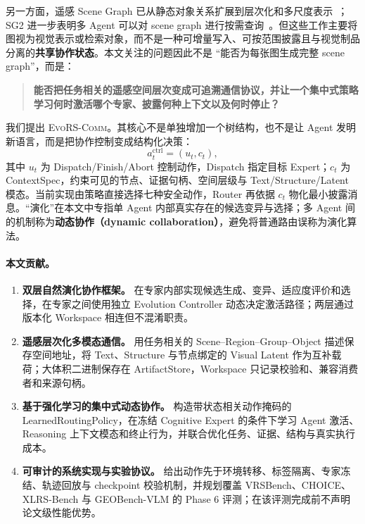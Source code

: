\documentclass[10pt,a4paper,twocolumn]{ctexart}
\newcommand{\ours}{\textsc{EvoRS-Comm}}
\begin{document}
另一方面，遥感 Scene Graph 已从静态对象关系扩展到层次化和多尺度表示~\cite{knyaz2025,knyaz2026}；SG2 进一步表明多 Agent 可以对 scene graph 进行按需查询~\cite{sg2}。但这些工作主要将图视为视觉表示或检索对象，而不是一种可增量写入、可按范围披露且与视觉制品分离的\textbf{共享协作状态}。本文关注的问题因此不是 ``能否为每张图生成完整 scene graph''，而是：

\begin{quote}\small
\textbf{能否把任务相关的遥感空间层次变成可追溯通信协议，并让一个集中式策略学习何时激活哪个专家、披露何种上下文以及何时停止？}
\end{quote}

我们提出 \ours。其核心不是单独增加一个树结构，也不是让 Agent 发明新语言，而是把协作控制变成结构化决策：
\begin{equation}
 a_t^{\mathrm{ctrl}}=(u_t,c_t),
 \label{eq:commaction}
\end{equation}
其中 $u_t$ 为 Dispatch/Finish/Abort 控制动作，Dispatch 指定目标 Expert；$c_t$ 为 ContextSpec，约束可见的节点、证据句柄、空间层级与 Text/Structure/Latent 模态。当前实现由策略直接选择七种安全动作，Router 再依据 $c_t$ 物化最小披露消息。``演化''在本文中专指单 Agent 内部真实存在的候选变异与选择；多 Agent 间的机制称为\textbf{动态协作（dynamic collaboration）}，避免将普通路由误称为演化算法。

\paragraph{本文贡献。}
\begin{enumerate}
    \item \textbf{双层自然演化协作框架。} 在专家内部实现候选生成、变异、适应度评价和选择，在专家之间使用独立 Evolution Controller 动态决定激活路径；两层通过版本化 Workspace 相连但不混淆职责。
    \item \textbf{遥感层次化多模态通信。} 用任务相关的 Scene--Region--Group--Object 描述保存空间地址，将 Text、Structure 与节点绑定的 Visual Latent 作为互补载荷；大体积二进制保存在 ArtifactStore，Workspace 只记录校验和、兼容消费者和来源句柄。
    \item \textbf{基于强化学习的集中式动态协作。} 构造带状态相关动作掩码的 LearnedRoutingPolicy，在冻结 Cognitive Expert 的条件下学习 Agent 激活、Reasoning 上下文模态和终止行为，并联合优化任务、证据、结构与真实执行成本。
    \item \textbf{可审计的系统实现与实验协议。} 给出动作先于环境转移、标签隔离、专家冻结、轨迹回放与 checkpoint 校验机制，并规划覆盖 VRSBench、CHOICE、XLRS-Bench 与 GEOBench-VLM 的 Phase 6 评测；在该评测完成前不声明论文级性能优势。
\end{enumerate}
\end{document}
